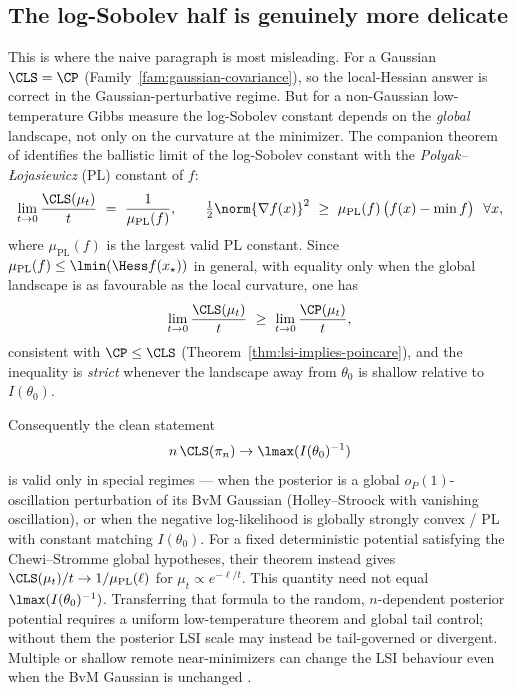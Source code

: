 \documentclass[../../main.tex]{subfiles}
\begin{document}
\subsection{The log-Sobolev half is genuinely more delicate}
\label{subsec:a2-lsi}

This is where the naive paragraph is most misleading. For a Gaussian $\CLS=\CP$
(Family~\ref{fam:gaussian-covariance}), so the local-Hessian answer is correct in the
Gaussian-perturbative regime. But for a non-Gaussian low-temperature Gibbs measure the
log-Sobolev constant depends on the \emph{global} landscape, not only on the curvature at the
minimizer. The companion theorem of \cite{ChewiStromme2024Ballistic} identifies the ballistic
limit of the log-Sobolev constant with the \emph{Polyak--{\L}ojasiewicz} (PL) constant of $f$:
\begin{equation}\label{eq:a2-cs-lsi}
  \lim_{t\to0}\frac{\CLS(\mu_t)}{t}\ =\ \frac{1}{\mu_{\mathrm{PL}}(f)},
  \qquad
  \tfrac12\norm{\nabla f(x)}^2\ \ge\ \mu_{\mathrm{PL}}(f)\,\big(f(x)-\min f\big)\ \ \forall x,
\end{equation}
where $\mu_{\mathrm{PL}}(f)$ is the largest valid PL constant. Since
$\mu_{\mathrm{PL}}(f)\le\lmin(\Hess f(x_\star))$ in general, with equality only when the global
landscape is as favourable as the local curvature, one has
\[
  \lim_{t\to0}\frac{\CLS(\mu_t)}{t}\ \ge\ \lim_{t\to0}\frac{\CP(\mu_t)}{t},
\]
consistent with $\CP\le\CLS$ (Theorem~\ref{thm:lsi-implies-poincare}), and the inequality is
\emph{strict} whenever the landscape away from $\theta_0$ is shallow relative to $I(\theta_0)$.

\begin{warning}
\label{warn:a2-lsi}
Consequently the clean statement
\[
  n\,\CLS(\pi_n)\to\lmax(I(\theta_0)^{-1})
\]
is valid only in special regimes --- when the posterior is a global $o_P(1)$-oscillation
perturbation of its BvM Gaussian (Holley--Stroock with vanishing oscillation), or when the
negative log-likelihood is globally strongly convex / PL with constant matching $I(\theta_0)$.
For a fixed deterministic potential satisfying the Chewi--Stromme global hypotheses, their
theorem instead gives
\(
  \CLS(\mu_t)/t\to 1/\mu_{\mathrm{PL}}(\ell)
\)
for $\mu_t\propto e^{-\ell/t}$.
This quantity need not equal $\lmax(I(\theta_0)^{-1})$. Transferring that formula to the random,
$n$-dependent posterior potential requires a uniform low-temperature theorem and global tail
control; without them the posterior LSI scale may instead be tail-governed or divergent. Multiple
or shallow remote near-minimizers can change the LSI behaviour even when the BvM Gaussian is
unchanged \cite{BenNejma2026Lojasiewicz}.
\end{warning}
\end{document}
